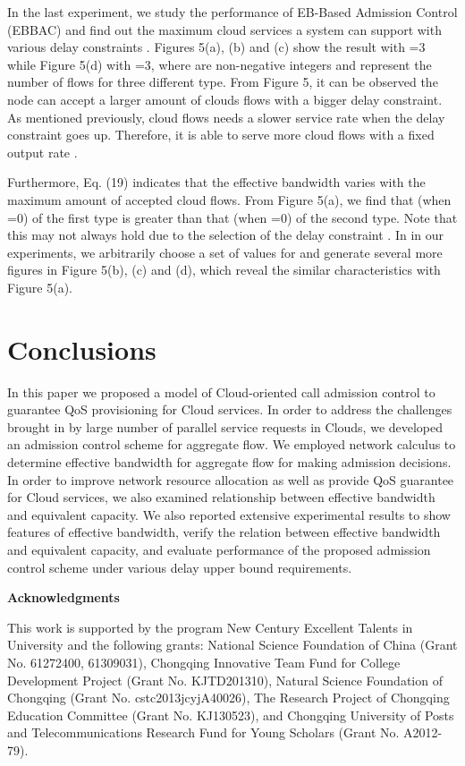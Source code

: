 \documentclass[a4paper]{article}
\begin{document}
In the last experiment, we study the performance of EB-Based Admission Control (EBBAC) and find out the maximum cloud services a system can support with various delay constraints . Figures 5(a), (b) and (c) show the result with =3 while Figure 5(d) with =3, where  are non-negative integers and represent the number of flows for three different type. From Figure 5, it can be observed the node can accept a larger amount of clouds flows with a bigger delay constraint. As mentioned previously, cloud flows needs a slower service rate when the delay constraint goes up. Therefore, it is able to serve more cloud flows with a fixed output rate .

Furthermore, Eq. (19) indicates that the effective bandwidth varies with the maximum amount of accepted cloud flows. From Figure 5(a), we find that  (when =0) of the first type is greater than that  (when =0) of the second type. Note that this may not always hold due to the selection of the delay constraint . In in our experiments, we arbitrarily choose a set of values for  and generate several more figures in Figure 5(b), (c) and (d), which reveal the similar characteristics with Figure 5(a).

\section{Conclusions}

In this paper we proposed a model of Cloud-oriented call admission control to guarantee QoS provisioning for Cloud services. In order to address the challenges brought in by large number of parallel service requests in Clouds, we developed an admission control scheme for aggregate flow. We employed network calculus to determine effective bandwidth for aggregate flow for making admission decisions. In order to improve network resource allocation as well as provide QoS guarantee for Cloud services, we also examined relationship between effective bandwidth and equivalent capacity. We also reported extensive experimental results to show features of effective bandwidth, verify the relation between effective bandwidth and equivalent capacity, and evaluate performance of the proposed admission control scheme under various delay upper bound requirements.

\begin{flushleft}
  \Large
  \textbf{Acknowledgments}
\end{flushleft}

This work is supported by the program New Century Excellent Talents in University and the following grants: National Science Foundation of China (Grant No. 61272400, 61309031), Chongqing Innovative Team Fund for College Development Project (Grant No. KJTD201310), Natural Science Foundation of Chongqing (Grant No. cstc2013jcyjA40026), The Research Project of Chongqing Education Committee (Grant No. KJ130523), and Chongqing University of Posts and Telecommunications Research Fund for Young Scholars (Grant No. A2012-79).



\end{document}
